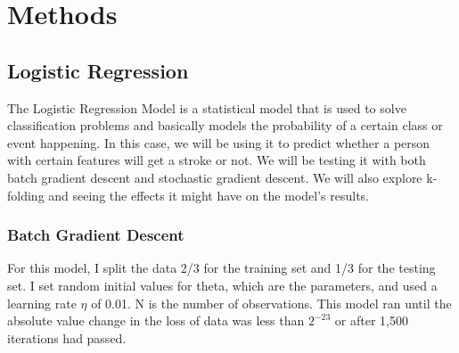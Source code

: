 \section{Methods}
\label{sec:methods}

\subsection{Logistic Regression}
\label{sec:methods:Logistic Regression}

The Logistic Regression Model is a statistical model that is used to solve classification problems and basically models the probability of a certain class or event happening. In this case, we will be using it to predict whether a person with certain features will get a stroke or not. We will be testing it with both batch gradient descent and stochastic gradient descent. We will also explore k-folding and seeing the effects it might have on the model's results.

\subsubsection{Batch Gradient Descent}
\label{sec:methods:Logistic Regression Model:Batch Gradient Descent}
For this model, I split the data 2/3 for the training set and 1/3 for the testing set. I set random initial values for theta, which are the parameters, and used a learning rate $\eta$ of 0.01. N is the number of observations. This model ran until the absolute value change in the loss of data was less than $2^{-23}$ or after 1,500 iterations had passed.\\

